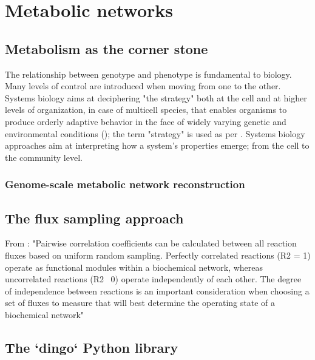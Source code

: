 \chapter{Metabolic networks}
\label{cha:4}


\section{Metabolism as the corner stone}

The relationship between genotype and phenotype is fundamental to biology.
Many levels of control are introduced when moving from one to the other. 
Systems biology aims at deciphering "the strategy" both at the cell and at higher levels of organization, in case of multicell species, that enables organisms to produce orderly adaptive behavior in the face of widely varying genetic and environmental conditions (\cite{strohman2002maneuvering}); the term "strategy" is used as per \cite{polanyi1968life}.
Systems biology approaches aim at interpreting how a system's properties emerge; from the cell to the community level.


\subsection{Genome-scale metabolic network reconstruction}




\section{The flux sampling approach}

From \citet{price2004genome} :
"Pairwise correlation coefficients can be calculated
between all reaction fluxes based on uniform random
sampling. Perfectly correlated reactions (R2 = 1) operate
as functional modules within a biochemical network,
whereas uncorrelated reactions (R2 ~0) operate independently of each other. The degree of independence
between reactions is an important consideration when
choosing a set of fluxes to measure that will best determine the operating state of a biochemical network"

\citeauthor{polanyi1968life}

\section{The `dingo` Python library}



